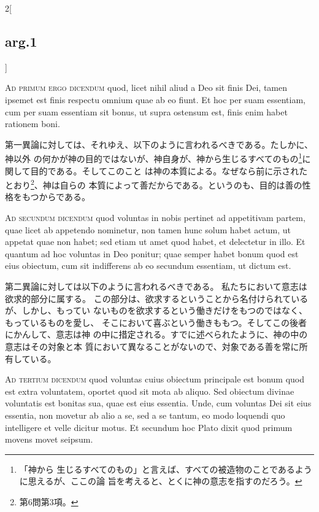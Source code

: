 \documentclass[paper=a4paper,fontsize=10pt,jafontsize=9pt,titlepage]{jlreq}
\begin{document}
\begin{paracol}{2}[\subsection{arg.1}]
\switchcolumn*[\subsection{ad.1}]


{\scshape Ad primum ergo dicendum} quod, licet nihil
aliud a Deo sit finis Dei, tamen ipsemet est finis respectu omnium quae
ab eo fiunt. Et hoc per suam essentiam, cum per suam essentiam sit
bonus, ut supra ostensum est, finis enim habet rationem boni.

\switchcolumn

第一異論に対しては、それゆえ、以下のように言われるべきである。たしかに、神以外
の何かが神の目的ではないが、神自身が、神から生じるすべてのもの\footnote{「神から
生じるすべてのもの」と言えば、すべての被造物のことであるように思えるが、ここの論
旨を考えると、とくに神の意志を指すのだろう。}に関して目的である。そしてこのこと
は神の本質による。なぜなら前に示されたとおり\footnote{第6問第3項。}、神は自らの
本質によって善だからである。というのも、目的は善の性格をもつからである。

\switchcolumn*[\subsection{ad.2}]


{\scshape Ad secundum dicendum} quod voluntas in nobis
pertinet ad appetitivam partem, quae licet ab appetendo nominetur, non
tamen hunc solum habet actum, ut appetat quae non habet; sed etiam ut
amet quod habet, et delectetur in illo. Et quantum ad hoc voluntas in
Deo ponitur; quae semper habet bonum quod est eius obiectum, cum sit
indifferens ab eo secundum essentiam, ut dictum est.

\switchcolumn

第二異論に対しては以下のように言われるべきである。
 私たちにおいて意志は欲求的部分に属する。
 この部分は、欲求するということから名付けられているが、しかし、もってい
 ないものを欲求するという働きだけをもつのではなく、もっているものを愛し、
 そこにおいて喜ぶという働きももつ。そしてこの後者にかんして、意志は神
 の中に措定される。すでに述べられたように、神の中の意志はその対象と本
 質において異なることがないので、対象である善を常に所有している。

\switchcolumn*[\subsection{ad.3}]


{\scshape Ad tertium dicendum} quod voluntas cuius
obiectum principale est bonum quod est extra voluntatem, oportet quod
sit mota ab aliquo. Sed obiectum divinae voluntatis est bonitas sua,
quae est eius essentia. Unde, cum voluntas Dei sit eius essentia, non
movetur ab alio a se, sed a se tantum, eo modo loquendi quo intelligere
et velle dicitur motus. Et secundum hoc Plato dixit quod primum movens
movet seipsum.


\end{paracol}
\end{document}
